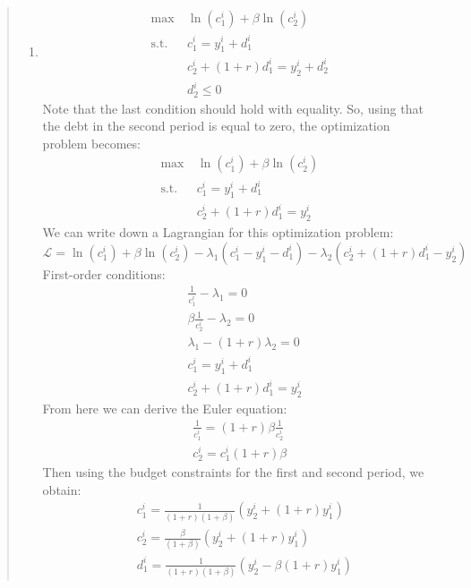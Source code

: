 \begin{exercise}
\begin{quote}
\begin{enumerate}
\item 
\begin{align*}
\max\ &\ln(c^i_1) +\beta \ln(c^i_2) \\
\text{s.t.}\ & c^i_1  = y^i_1 + d^i_1 \\
& c^i_2 + (1+r)d^i_1 = y^i_2 + d^i_2\\
& d^i_2 \le 0
\end{align*}
Note that the last condition should hold  with equality. So, using that the debt in the second period is equal to zero, the optimization problem becomes:
\begin{align*}
\max\ &\ln(c^i_1) +\beta \ln(c^i_2) \\
\text{s.t.}\ & c^i_1  = y^i_1 + d^i_1 \\
& c^i_2 + (1+r)d^i_1 = y^i_2
\end{align*}
We can write down a Lagrangian for this optimization problem:
\begin{equation*}
\mathcal{L} = \ln(c^i_1) +\beta \ln(c^i_2) - \lambda_1 (c^i_1  -  y^i_1 - d^i_1) - \lambda_2 (c^i_2 + (1+r)d^i_1 - y^i_2)
\end{equation*}
First-order conditions:
\begin{align*}
& \frac{1}{c^i_1} -\lambda_1 = 0 \\
& \beta\frac{1}{c^i_2} - \lambda_2 = 0 \\
& \lambda_1 - (1+r)\lambda_2 = 0 \\
& c^i_1  = y^i_1 + d^i_1 \\
& c^i_2 + (1+r)d^i_1 = y^i_2
\end{align*}
From here we can derive the Euler equation:
\begin{align*}
\frac{1}{c^i_1} = (1+r)\beta\frac{1}{c^i_2} \\
c^i_2 = c^i_1 (1+r)\beta
\end{align*}
Then using the budget constraints for the first and second period, we obtain:
\begin{align*}
&c^i_1 = \frac{1}{(1+r)(1+\beta)}(y^i_2 +(1+r)y^i_1) \\
&c^i_2 = \frac{\beta}{(1+\beta)}(y^i_2 +(1+r)y^i_1) \\
& d^i_1 = \frac{1}{(1+r)(1+\beta)}(y^i_2 - \beta(1+r)y^i_1)
\end{align*}


\end{enumerate}
\end{quote}
\end{exercise}
